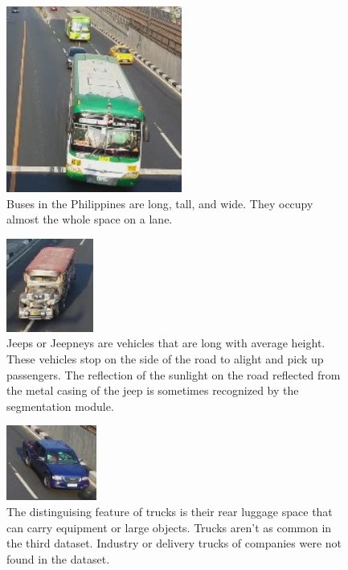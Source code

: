 \documentclass[conference]{IEEEtran}
\begin{document}
\begin{figure}[!h]
\centering
\includegraphics{vehicle_bus.png}
\caption{Buses in the Philippines are long, tall, and wide. They occupy almost the whole space  on a lane.}
\label{fig_bus}
\end{figure}

\begin{figure}[!h]
\centering
\includegraphics{vehicle_jeep.png}
\caption{Jeeps or Jeepneys are vehicles that are long with average height. These vehicles stop on the side of the road to alight and pick up passengers. The reflection of the sunlight on the road reflected from the metal casing of the jeep is sometimes recognized by the segmentation module.}
\label{fig_jeep}
\end{figure}

\begin{figure}[!h]
\centering
\includegraphics{vehicle_truck.png}
\caption{The distinguising feature of trucks is their rear luggage space that can carry equipment or large objects. Trucks aren't as common in the third dataset. Industry or delivery trucks of companies were not found in the dataset.}
\label{fig_truck}
\end{figure}
\end{document}

